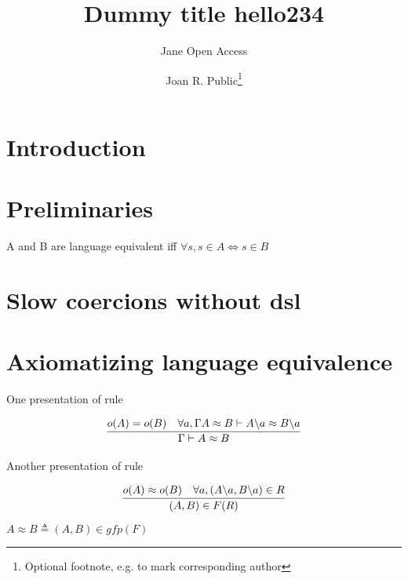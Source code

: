 \documentclass[a4paper,UKenglish,cleveref, autoref, thm-restate]{lipics-v2021}
\title{Dummy title hello234} %
\author{Jane {Open Access}}{Dummy University Computing Laboratory, [optional: Address], Country \and My second affiliation, Country \and \url{http://www.myhomepage.edu} }{johnqpublic@dummyuni.org}{https://orcid.org/0000-0002-1825-0097}{(Optional) author-specific funding acknowledgements}%
\author{Joan R. Public\footnote{Optional footnote, e.g. to mark corresponding author}}{Department of Informatics, Dummy College, [optional: Address], Country}{joanrpublic@dummycollege.org}{[orcid]}{[funding]}
\begin{document}


\maketitle

\begin{abstract}
\end{abstract}

\section{Introduction}
\section{Preliminaries}
\begin{definition}
A and B are language equivalent iff $\forall s, s \in A \iff s \in B$
\end{definition}
\section{Slow coercions without dsl}
\section{Axiomatizing language equivalence}
One presentation of rule
\begin{definition}
\begin{displaymath}
\infer{\Gamma \vdash A \approx B}{\myo{A} = \myo{B} & \forall a, \Gamma A \approx B \vdash \derive{A}{a} \approx \derive{B}{a}}
\end{displaymath}
\end{definition}

Another presentation of rule
\begin{definition}
\begin{displaymath}
\infer{(A,B) \in F(R)}{\myo{A} \approx \myo{B} & \forall a, (\derive{A}{a},\derive{B}{a}) \in R}
\end{displaymath}
$A \approx B  \triangleq (A,B) \in gfp(F)$
\end{definition}
\end{document}
